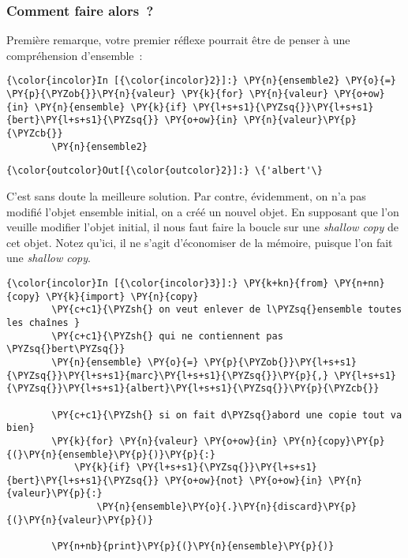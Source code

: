     \hypertarget{comment-faire-alors}{%
\subsubsection{Comment faire alors~?}\label{comment-faire-alors}}

    Première remarque, votre premier réflexe pourrait être de penser à une
compréhension d'ensemble~:

    \begin{Verbatim}[commandchars=\\\{\},frame=single,framerule=0.3mm,rulecolor=\color{cellframecolor}]
{\color{incolor}In [{\color{incolor}2}]:} \PY{n}{ensemble2} \PY{o}{=} \PY{p}{\PYZob{}}\PY{n}{valeur} \PY{k}{for} \PY{n}{valeur} \PY{o+ow}{in} \PY{n}{ensemble} \PY{k}{if} \PY{l+s+s1}{\PYZsq{}}\PY{l+s+s1}{bert}\PY{l+s+s1}{\PYZsq{}} \PY{o+ow}{in} \PY{n}{valeur}\PY{p}{\PYZcb{}}
        \PY{n}{ensemble2}
\end{Verbatim}


\begin{Verbatim}[commandchars=\\\{\},frame=single,framerule=0.3mm,rulecolor=\color{cellframecolor}]
{\color{outcolor}Out[{\color{outcolor}2}]:} \{'albert'\}
\end{Verbatim}
            
    C'est sans doute la meilleure solution. Par contre, évidemment, on n'a
pas modifié l'objet ensemble initial, on a créé un nouvel objet. En
supposant que l'on veuille modifier l'objet initial, il nous faut faire
la boucle sur une \emph{shallow copy} de cet objet. Notez qu'ici, il ne
s'agit d'économiser de la mémoire, puisque l'on fait une \emph{shallow
copy}.

    \begin{Verbatim}[commandchars=\\\{\},frame=single,framerule=0.3mm,rulecolor=\color{cellframecolor}]
{\color{incolor}In [{\color{incolor}3}]:} \PY{k+kn}{from} \PY{n+nn}{copy} \PY{k}{import} \PY{n}{copy}
        \PY{c+c1}{\PYZsh{} on veut enlever de l\PYZsq{}ensemble toutes les chaînes }
        \PY{c+c1}{\PYZsh{} qui ne contiennent pas \PYZsq{}bert\PYZsq{}}
        \PY{n}{ensemble} \PY{o}{=} \PY{p}{\PYZob{}}\PY{l+s+s1}{\PYZsq{}}\PY{l+s+s1}{marc}\PY{l+s+s1}{\PYZsq{}}\PY{p}{,} \PY{l+s+s1}{\PYZsq{}}\PY{l+s+s1}{albert}\PY{l+s+s1}{\PYZsq{}}\PY{p}{\PYZcb{}}
        
        \PY{c+c1}{\PYZsh{} si on fait d\PYZsq{}abord une copie tout va bien}
        \PY{k}{for} \PY{n}{valeur} \PY{o+ow}{in} \PY{n}{copy}\PY{p}{(}\PY{n}{ensemble}\PY{p}{)}\PY{p}{:}
            \PY{k}{if} \PY{l+s+s1}{\PYZsq{}}\PY{l+s+s1}{bert}\PY{l+s+s1}{\PYZsq{}} \PY{o+ow}{not} \PY{o+ow}{in} \PY{n}{valeur}\PY{p}{:}
                \PY{n}{ensemble}\PY{o}{.}\PY{n}{discard}\PY{p}{(}\PY{n}{valeur}\PY{p}{)}
                
        \PY{n+nb}{print}\PY{p}{(}\PY{n}{ensemble}\PY{p}{)}
\end{Verbatim}


